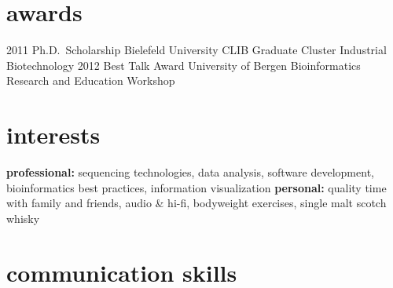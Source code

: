 \documentclass[]{friggeri-cv}
\begin{document}

\section{awards}

\begin{entrylist}
\entry
{2011}
{Ph.D.\ Scholarship}
{Bielefeld University}
{CLIB Graduate Cluster Industrial Biotechnology}
\entry
{2012}
{Best Talk Award}
{University of Bergen}
{Bioinformatics Research and Education Workshop}
\end{entrylist}


\section{interests}

\textbf{professional:} sequencing technologies, data analysis, software development, bioinformatics best practices, information visualization \textbf{personal:} quality time with family and friends, audio \& hi-fi, bodyweight exercises, single malt scotch whisky

\newpage
\section{communication skills}
\end{document}
